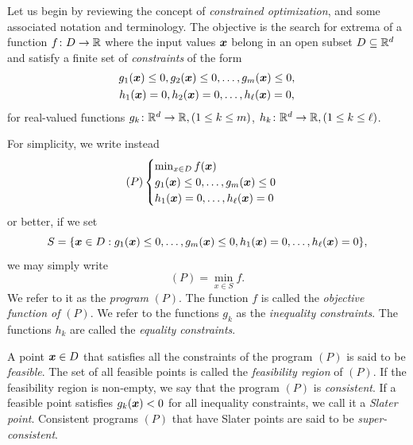 
Let us begin by reviewing the concept of \emph{constrained optimization}, and some associated notation and terminology.  The objective is the search for extrema of a function $f \colon D \to \mathbb{R}$ where the input values $\boldsymbol{x}$ belong in an open subset $D \subseteq \mathbb{R}^d$ and satisfy a finite set of \emph{constraints} of the form
\begin{gather*}
g_1(\boldsymbol{x}) \leq 0, g_2(\boldsymbol{x}) \leq 0, \dotsc, g_m(\boldsymbol{x}) \leq 0, \\
h_1(\boldsymbol{x}) = 0, h_2(\boldsymbol{x}) = 0, \dotsc, h_\ell(\boldsymbol{x}) = 0,
\end{gather*}
for real-valued functions $g_k\colon \mathbb{R}^d \to \mathbb{R}, (1\leq k \leq m)$, $h_k \colon \mathbb{R}^d \to \mathbb{R}, (1\leq k \leq \ell)$.

For simplicity, we write instead
\begin{equation}\label{equation:programP}
(P) \begin{cases} \min_{x\in D}f(\boldsymbol{x}) \\ g_1(\boldsymbol{x}) \leq 0, \dotsc, g_m(\boldsymbol{x}) \leq 0 \\ h_1(\boldsymbol{x}) = 0, \dotsc, h_\ell(\boldsymbol{x}) =0 \end{cases}
\end{equation}
or better, if we set 
\begin{equation*}
S = \{ \boldsymbol{x} \in D : g_1(\boldsymbol{x}) \leq 0, \dotsc, g_m(\boldsymbol{x}) \leq 0, h_1(\boldsymbol{x}) = 0, \dotsc, h_\ell(\boldsymbol{x})=0\},
\end{equation*} we may simply write 
\begin{equation*}
(P) = \min_{x\in S} f.
\end{equation*}
We refer to it as the \emph{program} $(P)$. The function $f$ is called the \emph{objective function of }$(P)$.  We refer to the functions $g_k$ as the \emph{inequality constraints}.  The functions $h_k$ are called the \emph{equality constraints}.

A point $\boldsymbol{x} \in D$ that satisfies all the constraints of the program $(P)$ is said to be \emph{feasible}.  The set of all feasible points is called the \emph{feasibility region} of $(P)$.  If the feasibility region is non-empty, we say that the program $(P)$ is \emph{consistent}. If a feasible point satisfies $g_k(\boldsymbol{x}) < 0$ for all inequality constraints, we call it a \emph{Slater point}. Consistent programs $(P)$ that have Slater points are said to be \emph{super-consistent}.

